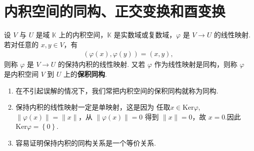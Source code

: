 \documentclass[../../main.tex]{subfiles}%
\begin{document}
\section{内积空间的同构、正交变换和酉变换}

\begin{definition}[保积同构]
设 $V$ 与 $U$ 是域 $\mathbb{K}$ 上的内积空间，$\mathbb{K}$ 是实数域或复数域，$\varphi$ 是 $V \to U$ 的线性映射. 若对任意的 $x,y \in V$，有
\begin{align*}
(\varphi(x),\varphi(y)) = (x,y),
\end{align*}
则称 $\varphi$ 是 $V \to U$ 的保持内积的线性映射. 又若 $\varphi$ 作为线性映射是同构，则称 $\varphi$ 是内积空间 $V$ 到 $U$ 上的\textbf{保积同构}.
\end{definition}
\begin{remark}
\begin{enumerate}
\item 在不引起误解的情况下，我们常把内积空间的保积同构就称为同构.

\item 保持内积的线性映射一定是单映射，这是因为 任取$x\in \mathrm{Ker}\varphi $,$\|\varphi(x)\| = \|x\|$，从 $\|\varphi(x)\| = 0$ 得到 $\|x\| = 0$，故 $x = 0$.因此$\mathrm{Ker}\varphi =\left\{ 0 \right\} .$

\item 容易证明保持内积的同构关系是一个等价关系.
\end{enumerate}
\end{remark}
\end{document}
